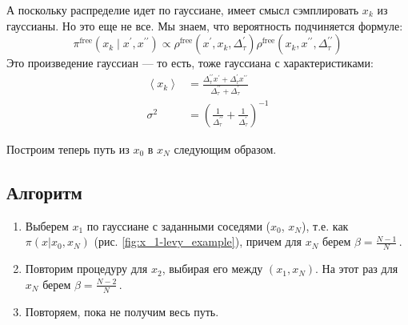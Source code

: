 \begin{lecture}
    А поскольку распределие идет по гауссиане, имеет смысл сэмплировать $x_k$ из гауссианы.
    Но это еще не все.
    Мы знаем, что вероятность подчиняется формуле:
    \begin{equation}
        \label{eq:pi_free-x'-x''}
        \pi^{\mathrm{free}}\left(x_{k} \mid x^{\prime}, x^{\prime \prime}\right) \propto \rho^{\mathrm{free}}\left(x^{\prime}, x_{k}, \Delta_{\tau}^{\prime}\right) \rho^{\mathrm{free}}\left(x_{k}, x^{\prime \prime}, \Delta_{\tau}^{\prime \prime}\right)
    \end{equation}
    Это произведение гауссиан --- то есть, тоже гауссиана с характеристиками:
    \begin{align}
        \label{eq:gauss-params-slice-x'-x''-mean}
        \left\langle x_{k}\right\rangle &=
        \frac{\Delta_{\tau}^{\prime \prime} x^{\prime}+\Delta_{\tau}^{\prime} x^{\prime \prime}}{\Delta_{\tau}^{\prime \prime}+\Delta_{\tau}^{\prime}} \\ \sigma^{2} &=
        \label{eq:gauss-params-slice-x'-x''-sigma}
        \left(\frac{1}{\Delta_{\tau}^{\prime \prime}}+\frac{1}{\Delta_{\tau}^{\prime}}\right)^{-1}
    \end{align}
    
    Построим теперь путь из $x_0$ в $x_N$ следующим образом.
    \subsection{Алгоритм}
    \label{enum:levy-algorithm}
    \begin{enumerate}
        \item Выберем $x_1$ по гауссиане с заданными соседями ($x_0$, $x_N$), т.е. как $\pi (x | x_0, x_N)$ (рис. \ref{fig:x_1-levy_example}), причем для $x_N$ берем $\beta = \frac{N-1}{N}\,$.
        \item Повторим процедуру для $x_2$, выбирая его между $(x_1, x_N)$.
            На этот раз для $x_N$ берем $\beta = \frac{N-2}{N}\,$.
        \item Повторяем, пока не получим весь путь.
    \end{enumerate}


\end{lecture}
